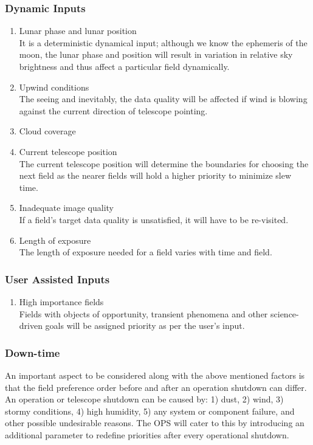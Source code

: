 \documentclass{article}
\begin{document}
\subsubsection{Dynamic Inputs}
\begin{enumerate}
   \item Lunar phase and lunar position\\
   It is a deterministic dynamical input; although we know the ephemeris of the moon, the lunar phase and position will result in variation in relative sky brightness and thus affect a particular field dynamically.
   \item Upwind conditions\\
   The seeing and inevitably, the data quality will be affected if wind is blowing against the current direction of telescope pointing.
   \item Cloud coverage\\
   \item Current telescope position\\
   The current telescope position will determine the boundaries for choosing the next field as the nearer fields will hold a higher priority to minimize slew time.
   \item Inadequate image quality\\
   If a field's target data quality is unsatisfied, it will have to be re-visited.
   \item Length of exposure\\
   The length of exposure needed for a field varies with time and field.
\end{enumerate}

\subsubsection{User Assisted Inputs}
\begin{enumerate}
    \item High importance fields\\
    Fields with objects of opportunity, transient phenomena and other science-driven goals will be assigned priority as per the user's input.
\end{enumerate}


\subsubsection{Down-time}
An important aspect to be considered along with the above mentioned factors is that the field preference order before and after an operation shutdown can differ. An operation or telescope shutdown can be caused by: 1) dust, 2) wind, 3) stormy conditions, 4) high humidity, 5) any system or component failure, and other possible undesirable reasons. The OPS will cater to this by introducing an additional parameter to redefine priorities after every operational shutdown.
\end{document}
